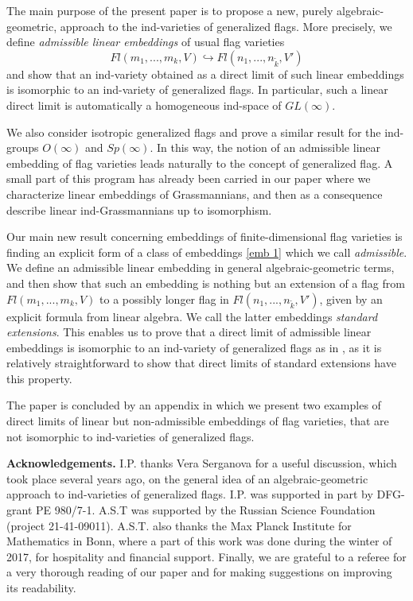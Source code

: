 \documentclass[12pt]{amsart}
\theoremstyle{definition}
\begin{document}
The main purpose of the present paper is to propose a new,
purely algebraic-geometric, approach to the ind-varieties of 
generalized flags. More precisely, we define 
\textit{admissible linear embeddings} of usual flag varieties
\begin{equation}\label{emb 1}
Fl(m_1,...,m_k,V)\hookrightarrow Fl(n_1,...,n_{\tilde{k}},V')
\end{equation}
and show that an ind-variety obtained as a direct limit of
such linear embeddings is isomorphic to an ind-variety of 
generalized flags. In particular, such a linear direct limit 
is automatically a homogeneous ind-space of $GL(\infty)$. 

We also consider isotropic generalized flags and prove a similar 
result for the ind-groups $O(\infty)$ and $Sp(\infty)$.
In this way, the notion of an admissible linear embedding of 
flag varieties leads naturally to the concept of generalized
flag. A small part of this program has already been 
carried in our paper \cite{PT} where we characterize linear 
embeddings of Grassmannians, and then as a consequence 
describe linear ind-Grassmannians up to isomorphism.

Our main new result concerning embeddings of 
finite-dimensional flag varieties is finding an explicit form
of a class of embeddings \eqref{emb 1} which we call 
\textit{admissible}. We define an admissible linear embedding
in general algebraic-geometric terms, and then show that such 
an embedding is nothing but an extension of a flag from
$Fl(m_1,...,m_k,V)$ to a possibly longer flag in
$Fl(n_1,...,n_{\tilde{k}},V')$, given by an explicit formula
from linear algebra. We call the latter embeddings 
\textit{standard extensions}. This enables us to prove that a
direct limit of admissible linear embeddings is isomorphic to
an ind-variety of generalized flags as in \cite{DP}, as it is
relatively straightforward to show that direct limits of
standard extensions have this property. 

The paper is concluded by an appendix in which we present two 
examples of direct limits of linear but non-admissible 
embeddings of flag varieties, that are not isomorphic to 
ind-varieties of generalized flags.

{\bf Acknowledgements.} I.P. thanks Vera Serganova for a useful
discussion, which took place several years ago, on the general 
idea of an algebraic-geometric approach to ind-varieties of 
generalized flags. I.P. was supported in part by DFG-grant PE 
980/7-1. A.S.T was supported by the Russian Science Foundation 
(project 21-41-09011). A.S.T. also thanks the Max Planck Institute 
for Mathematics in Bonn, where a part of this work was done during 
the winter of 2017, for hospitality and financial support.
Finally, we are grateful to a referee for a very thorough reading of 
our paper and for making suggestions on improving its readability.
\end{document}
